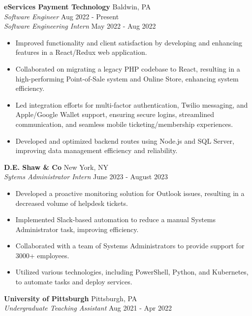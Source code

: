 \documentclass[letterpaper]{article}
\begin{document}
\textbf{eServices Payment Technology} \hfill Baldwin, PA\\
\textit{Software Engineer} \hfill Aug 2022 - Present\\
\textit{Software Engineering Intern} \hfill May 2022 - Aug 2022\\
\vspace{-1mm}
\begin{itemize} \itemsep -1pt
	\item Improved functionality and client satisfaction by developing and enhancing features in a React/Redux web application.
    \item Collaborated on migrating a legacy PHP codebase to React, resulting in a high-performing Point-of-Sale system and Online Store, enhancing system efficiency.
    \item Led integration efforts for multi-factor authentication, Twilio messaging, and Apple/Google Wallet support, ensuring secure logins, streamlined communication, and seamless mobile ticketing/membership experiences.
    \item Developed and optimized backend routes using Node.js and SQL Server, improving data management efficiency and reliability.
\end{itemize}
\vspace{-1mm}
\textbf{D.E. Shaw \& Co} \hfill New York, NY\\
\textit{Sytems Administrator Intern} \hfill June 2023 - August 2023\\
\vspace{-1mm}
\begin{itemize} \itemsep -1pt
	\item Developed a proactive monitoring solution for Outlook issues, resulting in a decreased volume of helpdesk tickets.
	\item Implemented Slack-based automation to reduce a manual Systems Administrator task, improving efficiency.
	\item Collaborated with a team of Systems Administrators to provide support for 3000+ employees.
	\item Utilized various technologies, including PowerShell, Python, and Kubernetes, to automate tasks and deploy services.
\end{itemize}
\vspace{-1mm}
\textbf{University of Pittsburgh} \hfill Pittsburgh, PA\\
\textit{Undergraduate Teaching Assistant} \hfill Aug 2021 - Apr 2022\\
\vspace{-1mm}
\end{document}
